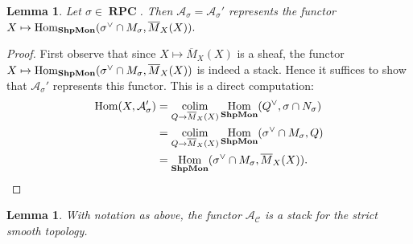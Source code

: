 \documentclass[11pt]{amsart}
\newtheorem{lemma}[theorem]{Lemma}
\theoremstyle{definition}
\theoremstyle{remark}
\DeclareMathOperator{\ShpMon}{\mathbf{ShpMon}}
\DeclareMathOperator{\RPC}{\mathbf{RPC}}
\def\colim{\qopname\relax m{colim}}
\DeclareMathOperator{\Hom}{\textup{Hom}}
\begin{document}
\begin{lemma}
	\label{lem:rpc_repr}
	Let $\sigma\in \RPC$. Then $\mathcal{A}_{\sigma}=\mathcal{A}_{\sigma}'$
	represents the functor $X\mapsto \Hom_{\ShpMon}(\sigma^{\vee}\cap M_{\sigma},\overline{M}_X(X)).$
\end{lemma}

\begin{proof}
	First observe that since $X\mapsto \overline{M}_X(X)$ is a sheaf, the
	functor $X\mapsto \Hom_{\ShpMon}(\sigma^{\vee}\cap M_{\sigma},\overline{M}_X(X))$
	is indeed a stack.
	Hence it suffices to show that $\mathcal{A}_{\sigma}'$ represents
	this functor. This is a direct computation:
\begin{align*}
	\Hom(X,\mathcal{A}_{\sigma}')&=\colim_{Q\to \overline{M}_X(X)}\Hom_{\ShpMon}(Q^{\vee},\sigma\cap N_{\sigma})\\
	&=\colim_{Q\to \overline{M}_X(X)}\Hom_{\ShpMon}(\sigma^{\vee}\cap M_{\sigma},Q)\\
	&=\Hom_{\ShpMon}(\sigma^{\vee}\cap M_{\sigma},\overline{M}_X(X)).
\end{align*}
\end{proof}

\begin{lemma}
	\label{lem:smooth_descent}
	With notation as above, the functor $\mathcal{A}_{\mathcal{C}}$
	is a stack for the strict smooth topology.
\end{lemma}
\end{document}
